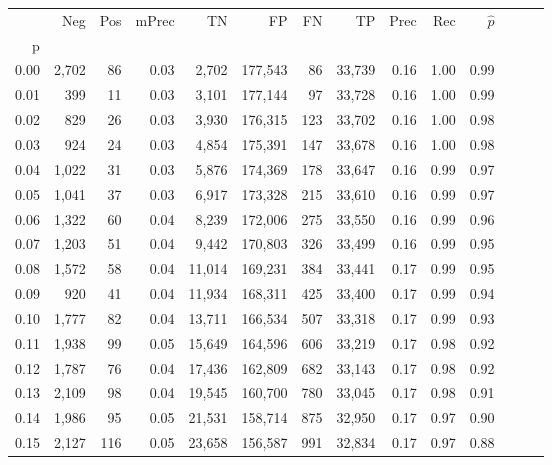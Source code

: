 \begin{tabular}{rrrrrrrrrrrrrr}
\toprule
{} &    Neg &  Pos & mPrec &       TN &       FP &      FN &      TP &  Prec &   Rec & $\hat{p}$ \\
p    &        &      &       &          &          &         &         &       &       &           \\
\midrule
0.00 &  2,702 &   86 &  0.03 &    2,702 &  177,543 &      86 &  33,739 &  0.16 &  1.00 &      0.99 \\
0.01 &    399 &   11 &  0.03 &    3,101 &  177,144 &      97 &  33,728 &  0.16 &  1.00 &      0.99 \\
0.02 &    829 &   26 &  0.03 &    3,930 &  176,315 &     123 &  33,702 &  0.16 &  1.00 &      0.98 \\
0.03 &    924 &   24 &  0.03 &    4,854 &  175,391 &     147 &  33,678 &  0.16 &  1.00 &      0.98 \\
0.04 &  1,022 &   31 &  0.03 &    5,876 &  174,369 &     178 &  33,647 &  0.16 &  0.99 &      0.97 \\
0.05 &  1,041 &   37 &  0.03 &    6,917 &  173,328 &     215 &  33,610 &  0.16 &  0.99 &      0.97 \\
0.06 &  1,322 &   60 &  0.04 &    8,239 &  172,006 &     275 &  33,550 &  0.16 &  0.99 &      0.96 \\
0.07 &  1,203 &   51 &  0.04 &    9,442 &  170,803 &     326 &  33,499 &  0.16 &  0.99 &      0.95 \\
0.08 &  1,572 &   58 &  0.04 &   11,014 &  169,231 &     384 &  33,441 &  0.17 &  0.99 &      0.95 \\
0.09 &    920 &   41 &  0.04 &   11,934 &  168,311 &     425 &  33,400 &  0.17 &  0.99 &      0.94 \\
0.10 &  1,777 &   82 &  0.04 &   13,711 &  166,534 &     507 &  33,318 &  0.17 &  0.99 &      0.93 \\
0.11 &  1,938 &   99 &  0.05 &   15,649 &  164,596 &     606 &  33,219 &  0.17 &  0.98 &      0.92 \\
0.12 &  1,787 &   76 &  0.04 &   17,436 &  162,809 &     682 &  33,143 &  0.17 &  0.98 &      0.92 \\
0.13 &  2,109 &   98 &  0.04 &   19,545 &  160,700 &     780 &  33,045 &  0.17 &  0.98 &      0.91 \\
0.14 &  1,986 &   95 &  0.05 &   21,531 &  158,714 &     875 &  32,950 &  0.17 &  0.97 &      0.90 \\
0.15 &  2,127 &  116 &  0.05 &   23,658 &  156,587 &     991 &  32,834 &  0.17 &  0.97 &      0.88 \\

\end{tabular}
